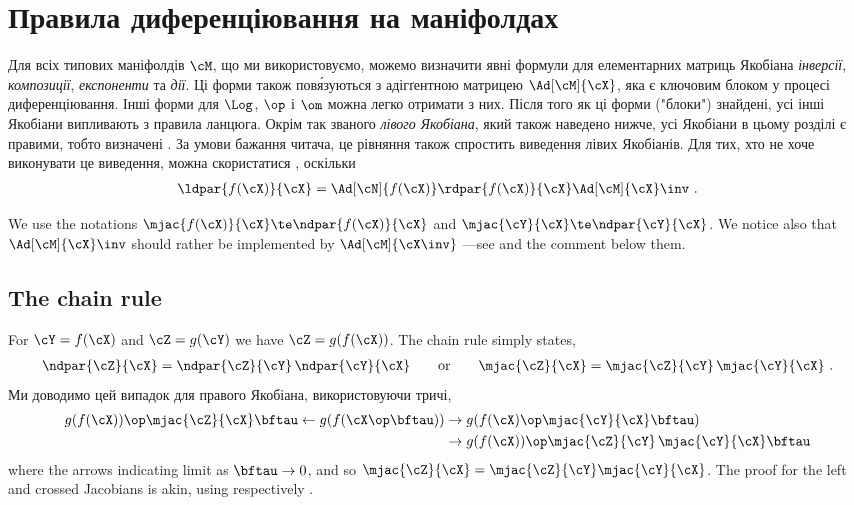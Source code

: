 
\section{Правила диференціювання на маніфолдах}
\label{sec:derivatives_M}

Для всіх типових маніфолдів $\cM$, що ми використовуємо, можемо визначити явні формули для елементарних матриць Якобіана \emph{інверсії}, \emph{композиції}, \emph{експоненти} та \emph{дії}.
Ці форми також пов\'язуються з адігґентною матрицею $\Ad[\cM]{\cX}$, яка є ключовим блоком у процесі диференціювання.
Інші форми для $\Log$, $\op$ і $\om$ можна легко отримати з них.
Після того як ці форми ("блоки") знайдені, усі інші Якобіани випливають з правила ланцюга.
Окрім так званого \emph{лівого Якобіана}, який також наведено нижче, усі Якобіани в цьому розділі є правими, тобто визначені .
За умови бажання читача, це рівняння також спростить виведення лівих Якобіанів.
Для тих, хто не хоче виконувати це виведення, можна скористатися , оскільки
%
\begin{align}
\ldpar{f(\cX)}{\cX} = \Ad[\cN]{f(\cX)}\rdpar{f(\cX)}{\cX} \Ad[\cM]{\cX}\inv
~.
\end{align}


We use the notations $\mjac{f(\cX)}{\cX}\te\ndpar{f(\cX)}{\cX}$ and $\mjac{\cY}{\cX}\te\ndpar{\cY}{\cX}$.
We notice also that $\Ad[\cM]{\cX}\inv$ should rather be implemented by $\Ad[\cM]{\cX\inv}$ ---see  and the comment below them.


\subsection{The chain rule}
\label{sec:jacs_chain_rule}

For $\cY=f(\cX)$ and $\cZ=g(\cY)$ we have $\cZ=g(f(\cX))$.
The chain rule simply states,
%
\begin{align}
\ndpar{\cZ}{\cX} = \ndpar{\cZ}{\cY}\,\ndpar{\cY}{\cX}
\qquad \textrm{or} \qquad
\mjac{\cZ}{\cX} = \mjac{\cZ}{\cY}\,\mjac{\cY}{\cX}
~.
\end{align}
%
Ми доводимо цей випадок для правого Якобіана, використовуючи  тричі,
%
\begin{align*}
g(f(\cX))\op\mjac{\cZ}{\cX}\bftau \gets g(f(\cX\op\bftau)) &\to g(f(\cX)\op\mjac{\cY}{\cX}\bftau) 
 \\
 &\to g(f(\cX))\op\mjac{\cZ}{\cY}\,\mjac{\cY}{\cX}\bftau
\end{align*}
%
where the arrows indicating limit as $\bftau\to0$, and so $\mjac{\cZ}{\cX}=\mjac{\cZ}{\cY}\mjac{\cY}{\cX}$.
The proof for the left and crossed Jacobians is akin, using respectively .

